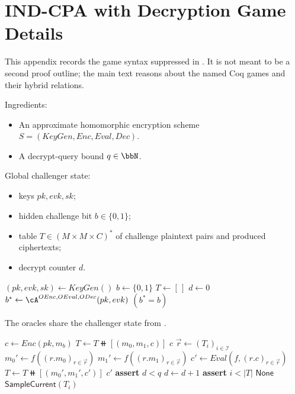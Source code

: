 \section{IND-CPA with Decryption Game Details}
\label{app:ind-cpad-game}

This appendix records the game syntax suppressed in .
It is not meant to be a second proof outline; the main text reasons about the named Coq games and their hybrid relations.

\begin{algorithm}
\caption{IND-CPAD Challenger Skeleton}
\label{alg:ind-cpad-game}
Ingredients:
\begin{itemize}
  \item An approximate homomorphic encryption scheme
    $S=(KeyGen,Enc,Eval,Dec)$.
  \item A decrypt-query bound $q\in\bbN$.
\end{itemize}
Global challenger state:
\begin{itemize}
  \item keys $pk,evk,sk$;
  \item hidden challenge bit $b\in\{0,1\}$;
  \item table $T\in(M\times M\times C)^*$ of challenge plaintext pairs and
    produced ciphertexts;
  \item decrypt counter $d$.
\end{itemize}
\begin{algorithmic}
    \State $(pk,evk,sk) \gets KeyGen()$
    \State $b \gets \{0,1\}$
    \State $T \gets [\,]$
    \State $d \gets 0$
    \State $b^* \gets \cA^{OEnc,OEval,ODec}(pk,evk)$
    \State \Return $(b^*=b)$
  \EndProcedure
\end{algorithmic}
\end{algorithm}

\begin{algorithm}
\caption{IND-CPAD Oracles}
\label{alg:ind-cpad-oracles}
The oracles share the challenger state from .
\begin{algorithmic}
    \State $c \gets Enc(pk,m_b)$
    \State $T \gets T \doubleplus [(m_0,m_1,c)]$
    \State \Return $c$
  \EndProcedure
  \State
    \State $\vec r \gets (T_i)_{i\in\mathcal{I}}$
    \State $m_0' \gets f((r.m_0)_{r\in\vec r})$
    \State $m_1' \gets f((r.m_1)_{r\in\vec r})$
    \State $c' \gets Eval(f,(r.c)_{r\in\vec r})$
    \State $T \gets T \doubleplus [(m_0',m_1',c')]$
    \State \Return $c'$
  \EndProcedure
  \State
    \State \textbf{assert} $d<q$
    \State $d \gets d+1$
    \State \textbf{assert} $i<|T|$
      \State \Return $\mathsf{None}$
    \Else
      \State \Return $\mathsf{SampleCurrent}(T_i)$
    \EndIf
  \EndProcedure
\end{algorithmic}
\end{algorithm}

